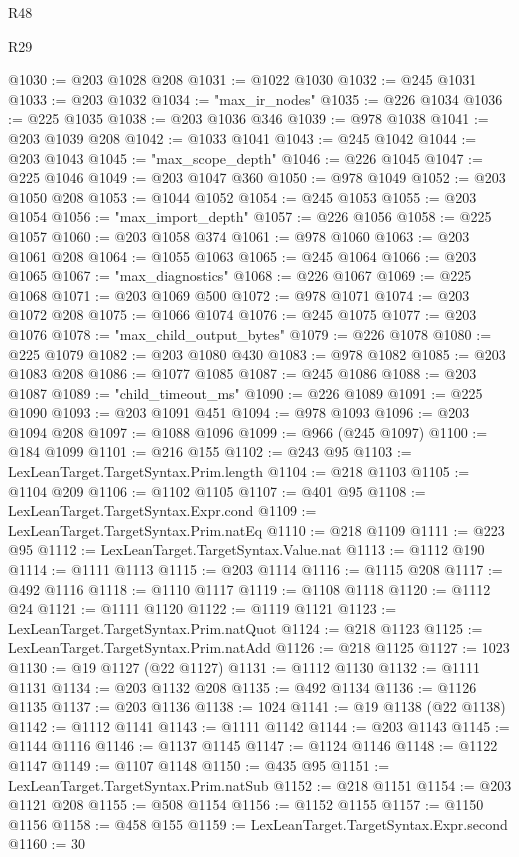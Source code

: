 \begin{lexlean}{R48}
\begin{lexlean}{R29}
\begin{coremodule}
{{{{{{{{{{{{{{{{{{{{{{{{{{{{{{{{{{{{{{{{{{{{{{{{{{{{{{{{{{{{{{{{{{{{{{{{{{{{{{{{{{{{{{{{{{{{{{{{{{{{{{{{{{{{{{{{{{{{{{{{{{{{{{{{{{{{{{{{{{{{{{{{{{{{{{{{{{{{{{{{{{{{{{{{{{{{{{{{{{{{{{{{{{{{{{{{{{{{{{{{{{{{{{{{{{{{{{{{{{@1030 := @203 @1028 @208
@1031 := @1022 @1030
@1032 := @245 @1031
@1033 := @203 @1032
@1034 := "max_ir_nodes"
@1035 := @226 @1034
@1036 := @225 @1035
@1038 := @203 @1036 @346
@1039 := @978 @1038
@1041 := @203 @1039 @208
@1042 := @1033 @1041
@1043 := @245 @1042
@1044 := @203 @1043
@1045 := "max_scope_depth"
@1046 := @226 @1045
@1047 := @225 @1046
@1049 := @203 @1047 @360
@1050 := @978 @1049
@1052 := @203 @1050 @208
@1053 := @1044 @1052
@1054 := @245 @1053
@1055 := @203 @1054
@1056 := "max_import_depth"
@1057 := @226 @1056
@1058 := @225 @1057
@1060 := @203 @1058 @374
@1061 := @978 @1060
@1063 := @203 @1061 @208
@1064 := @1055 @1063
@1065 := @245 @1064
@1066 := @203 @1065
@1067 := "max_diagnostics"
@1068 := @226 @1067
@1069 := @225 @1068
@1071 := @203 @1069 @500
@1072 := @978 @1071
@1074 := @203 @1072 @208
@1075 := @1066 @1074
@1076 := @245 @1075
@1077 := @203 @1076
@1078 := "max_child_output_bytes"
@1079 := @226 @1078
@1080 := @225 @1079
@1082 := @203 @1080 @430
@1083 := @978 @1082
@1085 := @203 @1083 @208
@1086 := @1077 @1085
@1087 := @245 @1086
@1088 := @203 @1087
@1089 := "child_timeout_ms"
@1090 := @226 @1089
@1091 := @225 @1090
@1093 := @203 @1091 @451
@1094 := @978 @1093
@1096 := @203 @1094 @208
@1097 := @1088 @1096
@1099 := @966 (@245 @1097)
@1100 := @184 @1099
@1101 := @216 @155
@1102 := @243 @95
@1103 := LexLeanTarget.TargetSyntax.Prim.length
@1104 := @218 @1103
@1105 := @1104 @209
@1106 := @1102 @1105
@1107 := @401 @95
@1108 := LexLeanTarget.TargetSyntax.Expr.cond
@1109 := LexLeanTarget.TargetSyntax.Prim.natEq
@1110 := @218 @1109
@1111 := @223 @95
@1112 := LexLeanTarget.TargetSyntax.Value.nat
@1113 := @1112 @190
@1114 := @1111 @1113
@1115 := @203 @1114
@1116 := @1115 @208
@1117 := @492 @1116
@1118 := @1110 @1117
@1119 := @1108 @1118
@1120 := @1112 @24
@1121 := @1111 @1120
@1122 := @1119 @1121
@1123 := LexLeanTarget.TargetSyntax.Prim.natQuot
@1124 := @218 @1123
@1125 := LexLeanTarget.TargetSyntax.Prim.natAdd
@1126 := @218 @1125
@1127 := 1023
@1130 := @19 @1127 (@22 @1127)
@1131 := @1112 @1130
@1132 := @1111 @1131
@1134 := @203 @1132 @208
@1135 := @492 @1134
@1136 := @1126 @1135
@1137 := @203 @1136
@1138 := 1024
@1141 := @19 @1138 (@22 @1138)
@1142 := @1112 @1141
@1143 := @1111 @1142
@1144 := @203 @1143
@1145 := @1144 @1116
@1146 := @1137 @1145
@1147 := @1124 @1146
@1148 := @1122 @1147
@1149 := @1107 @1148
@1150 := @435 @95
@1151 := LexLeanTarget.TargetSyntax.Prim.natSub
@1152 := @218 @1151
@1154 := @203 @1121 @208
@1155 := @508 @1154
@1156 := @1152 @1155
@1157 := @1150 @1156
@1158 := @458 @155
@1159 := LexLeanTarget.TargetSyntax.Expr.second
@1160 := 30
}}}}}}}}}}}}}}}}}}}}}}}}}}}}}}}}}}}}}}}}}}}}}}}}}}}}}}}}}}}}}}}}}}}}}}}}}}}}}}}}}}}}}}}}}}}}}}}}}}}}}}}}}}}}}}}}}}}}}}}}}}}}}}}}}}}}}}}}}}}}}}}}}}}}}}}}}}}}}}}}}}}}}}}}}}}}}}}}}}}}}}}}}}}}}}}}}}}}}}}}}}}}}}}}}}}}}}}}}}
\end{coremodule}
\end{lexlean}
\end{lexlean}
